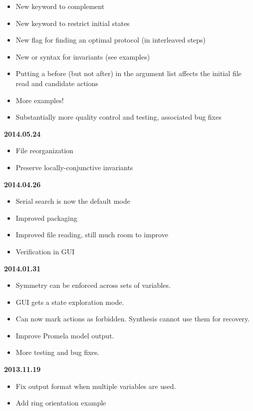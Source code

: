 \begin{itemize}
\item New  keyword to complement 
\item New  keyword to restrict initial states
\item New  flag for finding an optimal protocol (in interleaved steps)
\item New  or  syntax for invariants (see examples)
\item Putting a  before (but not after)  in the argument list affects the initial file read and candidate actions
\item More examples!
\item Substantially more quality control and testing, associated bug fixes
\end{itemize}
\textbf{2014.05.24}
\begin{itemize}
\item File reorganization
\item Preserve locally-conjunctive invariants
\end{itemize}
\textbf{2014.04.26}
\begin{itemize}
\item Serial search is now the default mode
\item Improved packaging
\item Improved file reading, still much room to improve
\item Verification in GUI
\end{itemize}
\textbf{2014.01.31}
\begin{itemize}
\item Symmetry can be enforced across sets of variables.
\item GUI gets a state exploration mode.
\item Can now mark actions as forbidden. Synthesis cannot use them for recovery.
\item Improve Promela model output.
\item More testing and bug fixes.
\end{itemize}
\textbf{2013.11.19}
\begin{itemize}
\item Fix output format when multiple variables are used.
\item Add ring orientation example
\end{itemize}

